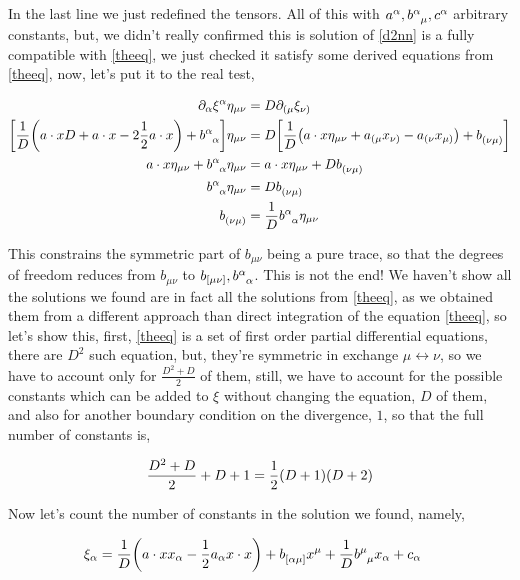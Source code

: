 In the last line we just redefined the tensors. All of this with $a^\alpha,\tensor{b}{^\alpha_\mu},c^\alpha$ arbitrary constants, but, we didn't really 
confirmed this is solution of \ref{d2nn} is a fully compatible with \ref{theeq}, we just checked it satisfy some derived equations from \ref{theeq}, now, let's put it to 
the real test,

\begin{align*}
    \partial_\alpha\xi^\alpha\eta_{\mu\nu}&=D\partial_{(\mu}\xi_{\nu)}\\
    \qty[\frac1D\qty(a\cdot x D+a\cdot x-2\frac12a\cdot x)+\tensor{b}{^\alpha_\alpha}]\eta_{\mu\nu}&=D\qty[\frac1D\qty(a\cdot x \eta_{\mu\nu}+a_{(\mu} x_{\nu)}-a_{(\nu} x_{\mu)})+\tensor{b}{_{(\nu}_{\mu)}}]\\
    a\cdot x\eta_{\mu\nu} +\tensor{b}{^\alpha_\alpha}\eta_{\mu\nu}&=a\cdot x \eta_{\mu\nu}+D\tensor{b}{_{(\nu}_{\mu)}}\\
    \tensor{b}{^\alpha_\alpha}\eta_{\mu\nu}&=D\tensor{b}{_{(\nu}_{\mu)}}\\
    \tensor{b}{_{(\nu}_{\mu)}}&=\frac1D\tensor{b}{^\alpha_\alpha}\eta_{\mu\nu}
\end{align*}

This constrains the symmetric part of $b_{\mu\nu}$ being a pure trace, so that the degrees of freedom reduces from $b_{\mu\nu}$ to $b_{[\mu\nu]}, \tensor{b}{^\alpha_\alpha}$. This is not the end! 
We haven't show all the solutions we found are in fact all the solutions from \ref{theeq}, as we obtained them from a different approach than direct integration of the equation \ref{theeq}, so let's show this, 
first, \ref{theeq} is a set of first order partial differential equations, there are $D^2$ such equation, but, they're symmetric in exchange $\mu\leftrightarrow\nu$, so we have to account only for $\frac{D^2+D}{2}$ of them, still, we have to account for 
the possible constants which can be added to $\xi$ without changing the equation, $D$ of them, and also for another boundary condition on the divergence, $1$, so that the full number of constants is,

\begin{align*}
    \frac{D^2+D}{2}+D+1=\frac12\qty(D+1)\qty(D+2)
\end{align*}

Now let's count the number of constants in the solution we found, namely,

\begin{align*}
    \xi_\alpha&=\frac1D\qty(a\cdot x x_\alpha-\frac12a_\alpha x\cdot x)+\tensor{b}{_{[\alpha}_{\mu]}}x^\mu+\frac1D\tensor{b}{^\mu_\mu}x_\alpha+c_\alpha
\end{align*}

